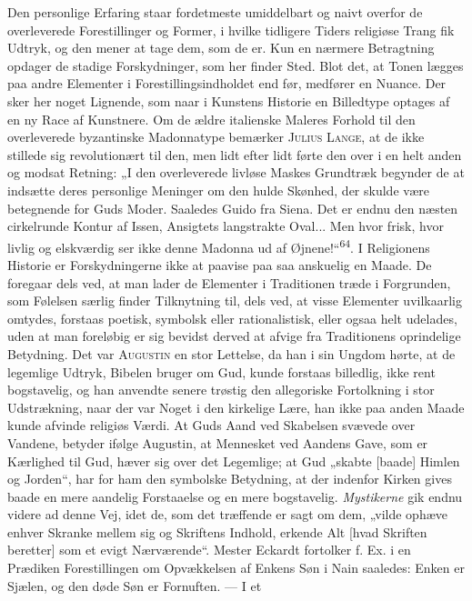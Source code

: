 \documentclass[12pt,a4paper,openany]{book}
\newcommand{\opage}[1]{\marginnote{\footnotesize\textit{[#1]}}}
\begin{document}
Den personlige Erfaring staar fordetmeste umiddelbart og naivt
\opage{121}overfor de overleverede Forestillinger og Former, i hvilke
tidligere Tiders religiøse Trang fik Udtryk, og den mener at tage dem,
som de er. Kun en nærmere Betragtning opdager de stadige Forskydninger,
som her finder Sted. Blot det, at Tonen lægges paa andre Elementer i
Forestillingsindholdet end før, medfører en Nuance. Der sker her noget
Lignende, som naar i Kunstens Historie en Billedtype optages af en ny
Race af Kunstnere. Om de ældre italienske Maleres Forhold til den
overleverede byzantinske Madonnatype bemærker \textsc{Julius Lange}, at
de ikke stillede sig revolutionært til den, men lidt efter lidt førte
den over i en helt anden og modsat Retning: „I den overleverede livløse
Maskes Grundtræk begynder de at indsætte deres personlige Meninger om
den hulde Skønhed, der skulde være betegnende for Guds Moder. Saaledes
Guido fra Siena. Det er endnu den næsten cirkelrunde Kontur af Issen,
Ansigtets langstrakte Oval... Men hvor frisk, hvor livlig og elskværdig
ser ikke denne Madonna ud af Øjnene!“\textsuperscript{64}. I Religionens
Historie er Forskydningerne ikke at paavise paa saa anskuelig en Maade.
De foregaar dels ved, at man lader de Elementer i Traditionen træde i
Forgrunden, som Følelsen særlig finder Tilknytning til, dels ved, at
visse Elementer uvilkaarlig omtydes, forstaas poetisk, symbolsk eller
rationalistisk, eller ogsaa helt udelades, uden at man foreløbig er sig
bevidst derved at afvige fra Traditionens oprindelige Betydning. Det var
\textsc{Augustin} en stor Lettelse, da han i sin Ungdom hørte, at de
legemlige Udtryk, Bibelen bruger om Gud, kunde forstaas billedlig, ikke
rent bogstavelig, og han anvendte senere trøstig den allegoriske
Fortolkning i stor Udstrækning, naar der var Noget i den kirkelige Lære,
han ikke paa anden Maade kunde afvinde religiøs Værdi. At Guds Aand ved
Skabelsen svævede over Vandene, betyder ifølge Augustin, at Mennesket
ved Aandens Gave, som er Kærlighed til Gud, hæver sig over det
Legemlige; at Gud „skabte [baade] Himlen og Jorden“, har for ham den
symbolske Betydning, at der indenfor Kirken gives baade en mere aandelig
Forstaaelse og en mere bogstavelig. \textit{Mystikerne} gik endnu videre
ad denne Vej, idet de, som det træffende er sagt om dem, „vilde ophæve
enhver Skranke mellem sig og Skriftens Indhold, erkende Alt [hvad
Skriften beretter] som et evigt Nærværende“. Mester Eckardt fortolker f.
Ex. i en Prædiken Forestillingen om Opvækkelsen af Enkens Søn i Nain
saaledes: Enken er Sjælen, og den døde Søn er Fornuften. --- I et
\end{document}
